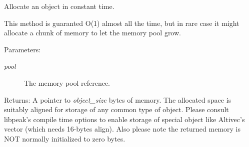 Allocate an object in constant time. 

This method is guaranted O(1) almost all the time, but in rare case it might allocate a chunk of memory to let the memory pool grow.

\begin{Desc}
\item[Parameters:]
\begin{description}
\item[{\em pool}]The memory pool reference.\end{description}
\end{Desc}
\begin{Desc}
\item[Returns:]A pointer to {\em object\_\-size\/} bytes of memory. The allocated space is suitably aligned for storage of any common type of object. Please consult libpeak's compile time options to enable storage of special object like Altivec's vector (which needs 16-bytes align). Also please note the returned memory is NOT normally initialized to zero bytes. \end{Desc}
